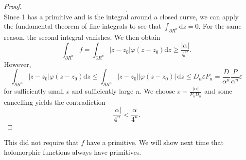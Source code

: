 \begin{proof}
\[	.\]
	Since 1 has a primitive and is the integral around a closed curve, we can apply the fundamental theorem of line integrals to see that $\int_{\partial R^n} \mathrm{d} z=0$. For the same reason, the second integral vanishes. We then obtain
	\[
		\int_{\partial R^n} f=\int_{\partial R^n} \left| z-z_0 \right| \varphi (z-z_0)\mathrm{d} z \geq  \frac{\left| \alpha  \right| }{4^{n} } 
	.\]
	However,
	\[
		\int_{\partial R^n}\left| z-z_0 \right| \varphi (z-z_0)\mathrm{d} z\leq \int_{\partial R^n} \left| z-z_0 \right| \left| \varphi (z-z_0) \right|  \,\mathrm{d} z\leq D_n\varepsilon P_n = \frac{D}{\alpha ^n} \frac{P}{\alpha ^n} \varepsilon 
	\]
	for sufficiently small $\varepsilon $ and sufficiently large $n$. We choose $\varepsilon =\frac{\left| \alpha  \right| }{P_nD_n} $ and some cancelling yields the contradiction
	\[
		\frac{\left| \alpha  \right| }{4^n} < \frac{\alpha }{4^n} 
	.\]
\end{proof}
\begin{remark}\label{2.0.4}
	This did not require that $f$ have a primitive. We will show next time that holomorphic functions always have primitives.
\end{remark}

